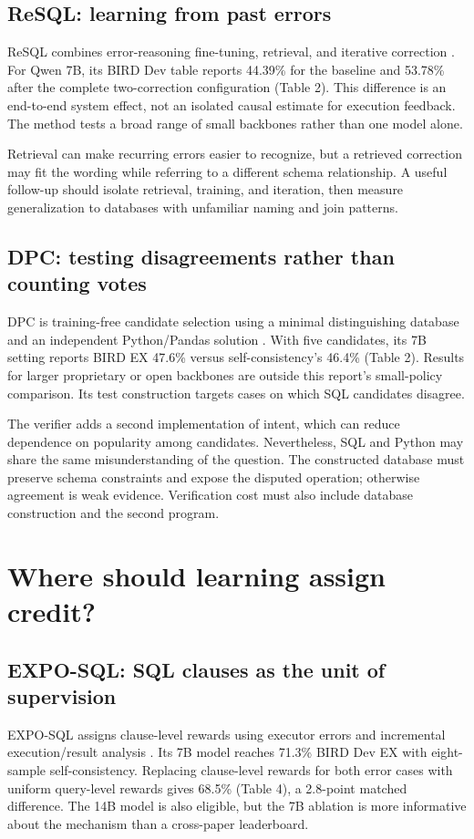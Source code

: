 \documentclass[11pt,a4paper]{article}
\begin{document}
\subsection{ReSQL: learning from past errors}
ReSQL combines error-reasoning fine-tuning, retrieval, and iterative correction \cite{resql}. For Qwen 7B, its BIRD Dev table reports 44.39\% for the baseline and 53.78\% after the complete two-correction configuration (Table 2). This difference is an end-to-end system effect, not an isolated causal estimate for execution feedback. The method tests a broad range of small backbones rather than one model alone.

Retrieval can make recurring errors easier to recognize, but a retrieved correction may fit the wording while referring to a different schema relationship. A useful follow-up should isolate retrieval, training, and iteration, then measure generalization to databases with unfamiliar naming and join patterns.

\subsection{DPC: testing disagreements rather than counting votes}
DPC is training-free candidate selection using a minimal distinguishing database and an independent Python/Pandas solution \cite{dpc}. With five candidates, its 7B setting reports BIRD EX 47.6\% versus self-consistency's 46.4\% (Table 2). Results for larger proprietary or open backbones are outside this report's small-policy comparison. Its test construction targets cases on which SQL candidates disagree.

The verifier adds a second implementation of intent, which can reduce dependence on popularity among candidates. Nevertheless, SQL and Python may share the same misunderstanding of the question. The constructed database must preserve schema constraints and expose the disputed operation; otherwise agreement is weak evidence. Verification cost must also include database construction and the second program.

\clearpage
\section{Where should learning assign credit?}
\subsection{EXPO-SQL: SQL clauses as the unit of supervision}
EXPO-SQL assigns clause-level rewards using executor errors and incremental execution/result analysis \cite{expo}. Its 7B model reaches 71.3\% BIRD Dev EX with eight-sample self-consistency. Replacing clause-level rewards for both error cases with uniform query-level rewards gives 68.5\% (Table 4), a 2.8-point matched difference. The 14B model is also eligible, but the 7B ablation is more informative about the mechanism than a cross-paper leaderboard.
\end{document}

